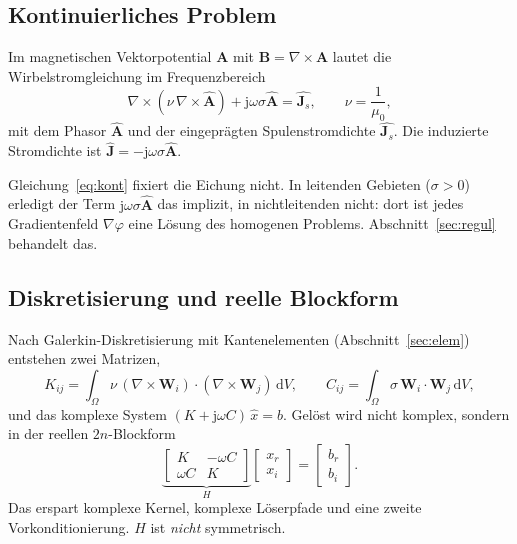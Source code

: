 \documentclass[11pt,a4paper]{article}
\newcommand{\Js}{\mathbf{J}_s}
\begin{document}
\subsection{Kontinuierliches Problem}

Im magnetischen Vektorpotential $\mathbf{A}$ mit $\mathbf{B} =
\nabla\times\mathbf{A}$ lautet die Wirbelstromgleichung im Frequenzbereich
\begin{equation}
  \nabla\times\left(\nu\,\nabla\times\hat{\mathbf{A}}\right)
  + \mathrm{j}\omega\sigma\hat{\mathbf{A}} = \hat{\Js},
  \qquad \nu = \frac{1}{\mu_0},
  \label{eq:kont}
\end{equation}
mit dem Phasor $\hat{\mathbf{A}}$ und der eingeprägten Spulenstromdichte
$\hat{\Js}$. Die induzierte Stromdichte ist
$\hat{\mathbf{J}} = -\mathrm{j}\omega\sigma\hat{\mathbf{A}}$.

Gleichung~\eqref{eq:kont} fixiert die Eichung nicht. In leitenden Gebieten
($\sigma > 0$) erledigt der Term $\mathrm{j}\omega\sigma\hat{\mathbf{A}}$ das
implizit, in nichtleitenden nicht: dort ist jedes Gradientenfeld
$\nabla\varphi$ eine Lösung des homogenen Problems. Abschnitt~\ref{sec:regul}
behandelt das.

\subsection{Diskretisierung und reelle Blockform}

Nach Galerkin-Diskretisierung mit Kantenelementen (Abschnitt~\ref{sec:elem})
entstehen zwei Matrizen,
\begin{equation}
  K_{ij} = \int_\Omega \nu\,(\nabla\times\mathbf{W}_i)\cdot(\nabla\times\mathbf{W}_j)\,\mathrm{d}V,
  \qquad
  C_{ij} = \int_\Omega \sigma\,\mathbf{W}_i\cdot\mathbf{W}_j\,\mathrm{d}V,
\end{equation}
und das komplexe System $(K + \mathrm{j}\omega C)\,\hat{x} = \hat{b}$. Gelöst
wird nicht komplex, sondern in der reellen $2n$-Blockform
\begin{equation}
  \underbrace{\begin{bmatrix} K & -\omega C \\ \omega C & K \end{bmatrix}}_{H}
  \begin{bmatrix} x_r \\ x_i \end{bmatrix}
  = \begin{bmatrix} b_r \\ b_i \end{bmatrix}.
  \label{eq:block}
\end{equation}
Das erspart komplexe Kernel, komplexe Löserpfade und eine zweite
Vorkonditionierung. $H$ ist \emph{nicht} symmetrisch.
\end{document}
